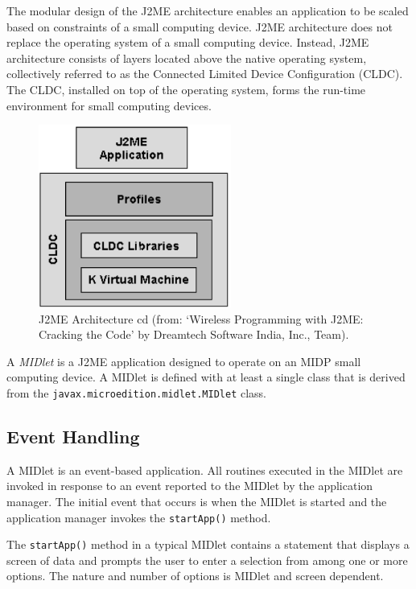 The modular design of the J2ME architecture enables an application to be scaled based on
constraints of a small computing device. J2ME architecture does not replace the operating
system of a small computing device. Instead, J2ME architecture consists of layers located
above the native operating system, collectively referred to as the Connected Limited
Device Configuration (CLDC). The CLDC, installed on top of the operating
system, forms the run-time environment for small computing devices.

\begin{figure}[t]%
\begin{center}
\includegraphics[height=6cm]{figures/j2me-architecture-2-b}
\end{center}
\caption{J2ME Architecture cd (from: `Wireless Programming with J2ME: Cracking the Code' by Dreamtech Software India, Inc., Team).}%
\label{fig:j2mearchitecture2}
\end{figure}

A \emph{MIDlet} is a J2ME application designed to operate on an MIDP small computing
device. A MIDlet is defined with at least a single class that is derived from the 
\texttt{javax\-.microedition\-.midlet\-.MIDlet} class.

\subsection{Event Handling}

A MIDlet is an event-based application. All routines executed in the MIDlet are invoked
in response to an event reported to the MIDlet by the application manager. The initial
event that occurs is when the MIDlet is started and the application manager invokes the
\texttt{startApp()} method.

The \texttt{startApp()} method in a typical MIDlet contains a statement that displays a screen
of data and prompts the user to enter a selection from among one or more options. The
nature and number of options is MIDlet and screen dependent.

